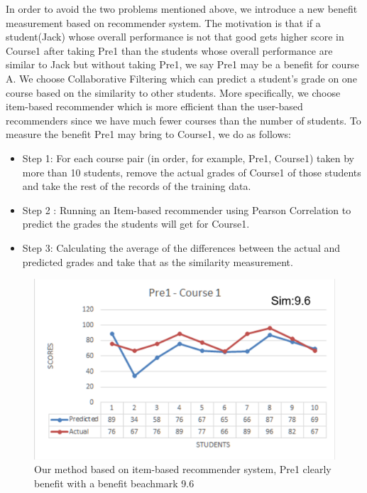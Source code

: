 In order to avoid the two problems mentioned above, we introduce a new benefit measurement based on recommender system. The motivation is that if a student(Jack) whose overall performance is not that good gets higher score in Course1 after taking Pre1 than the students whose overall performance are similar to Jack but without taking Pre1, we say Pre1 may be a benefit for course A.  We choose Collaborative Filtering which can predict a student’s grade on one course based on the similarity to other students. More specifically, we choose item-based recommender which is more efficient than the user-based recommenders since we have much fewer courses than the number of students.  To measure the benefit Pre1 may bring to Course1, we do as follows:
\begin{itemize}
	\item Step 1: For each course pair (in order, for example, Pre1, Course1) taken by more than 10 students, remove the actual grades of Course1 of those students and take the rest of the records of the training data. 
	\item Step 2 : Running an Item-based recommender using Pearson Correlation to predict the grades the students will get for Course1.
	\item Step 3: Calculating the average of the differences between the actual and predicted grades and take that as the similarity measurement.
\end{itemize}
\begin{figure}[h]
	\centering %
	\includegraphics[width=\columnwidth]{figs/measure} 
	\caption{Our method based on item-based recommender system, Pre1 clearly benefit with a benefit beachmark 9.6}
	\label{fig:sample}
\end{figure}






